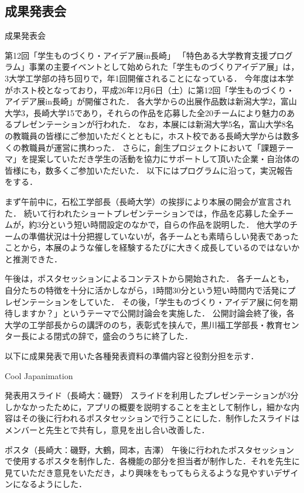 \subsection{成果発表会}
成果発表会

第12回「学生ものづくり・アイデア展in長崎」
「特色ある大学教育支援プログラム」事業の主要イベントとして始められた「学生ものづくりアイデア展」は，3大学工学部の持ち回りで，年1回開催されることになっている．
今年度は本学がホスト校となっており，平成26年12月6日（土）に第12回「学生ものづくり・アイデア展in長崎」が開催された．
各大学からの出展作品数は新潟大学2，富山大学3，長崎大学15であり，それらの作品を応募した全20チームにより魅力のあるプレゼンテーションが行われた．
なお，本展には新潟大学5名，富山大学8名の教職員の皆様にご参加いただくとともに，ホスト校である長崎大学からは数多くの教職員が運営に携わった．
さらに，創生プロジェクトにおいて「課題テーマ」を提案していただき学生の活動を協力にサポートして頂いた企業・自治体の皆様にも，数多くご参加いただいた．
以下にはプログラムに沿って，実況報告をする．

まず午前中に，石松工学部長（長崎大学）の挨拶により本展の開会が宣言された．
続いて行われたショートプレゼンテーションでは，作品を応募した全チームが，約3分という短い時間設定のなかで，自らの作品を説明した．
他大学のチームの準備状況は十分把握していないが，各チームとも素晴らしい発表であったことから，本展のような催しを経験するたびに大きく成長しているのではないかと推測できた．

午後は，ポスタセッションによるコンテストから開始された．
各チームとも，自分たちの特徴を十分に活かしながら，1時間30分という短い時間内で活発にプレゼンテーションをしていた．
その後，「学生ものづくり・アイデア展に何を期待しますか？」というテーマで公開討論会を実施した．
公開討論会終了後，各大学の工学部長からの講評ののち，表彰式を挟んで，黒川福工学部長・教育センター長による閉式の辞で，盛会のうちに終了した．

以下に成果発表で用いた各種発表資料の準備内容と役割分担を示す．

Cool Japanimation

発表用スライド（長崎大：磯野）
スライドを利用したプレゼンテーションが3分しかなかったために，アプリの概要を説明することを主として制作し，細かな内容はその後に行われるポスタセッションで行うことにした．制作したスライドはメンバーと先生とで共有し，意見を出し合い改善した．

ポスタ（長崎大：磯野，大鶴，岡本，吉澤）
午後に行われたポスタセッションで使用するポスタを制作した．各機能の部分を担当者が制作した．それを先生に見ていただき意見をいただき，より興味をもってもらえるような見やすいデザインになるようにした．

